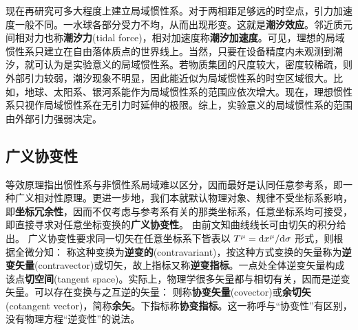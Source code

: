 现在再研究可多大程度上建立局域惯性系。对于两相距足够远的时空点，引力加速度一般不同。一水球各部分受力不均，从而出现形变。这就是\textbf{潮汐效应}。邻近质元间相对力也称\textbf{潮汐力}(tidal force)，相对加速度称\textbf{潮汐加速度}。可见，理想的局域惯性系只建立在自由落体质点的世界线上。当然，只要在设备精度内未观测到潮汐，就可认为是实验意义的局域惯性系。若物质集团的尺度较大，密度较稀疏，则外部引力较弱，潮汐现象不明显，因此能近似为局域惯性系的时空区域很大。比如，地球、太阳系、银河系能作为局域惯性系的范围应依次增大。现在，理想惯性系只视作局域惯性系在无引力时延伸的极限。综上，实验意义的局域惯性系的范围由外部引力强弱决定。

\subsection{广义协变性}

等效原理指出惯性系与非惯性系局域难以区分，因而最好是认同任意参考系，即一种广义相对性原理。更进一步地，我们本就默认物理对象、规律不受坐标系影响，即\textbf{坐标冗余性}，因而不仅考虑与参考系有关的那类坐标系，任意坐标系均可接受，即直接寻求对任意坐标变换的\textbf{广义协变性}。
由前文知曲线线长可由切矢的积分给出。
广义协变性要求同一切矢在任意坐标系下皆表以 $T^\mu=\dd x^\mu/\dd\sigma$ 形式，则根据全微分知：
称这种变换为\textbf{逆变的}(contravariant)，按这种方式变换的矢量称为\textbf{逆变矢量}(contravector)或切矢，故上指标又称\textbf{逆变指标}。一点处全体逆变矢量构成该点\textbf{切空间}(tangent space)。实际上，物理学很多矢量都与相切有关，因而是逆变矢量。可以存在变换与之互逆的矢量：
则称\textbf{协变矢量}(covector)或\textbf{余切矢}(cotangent vector)，简称\textbf{余矢}。下指标称\textbf{协变指标}。这一称呼与“协变性”有区别，没有物理方程“逆变性”的说法。

